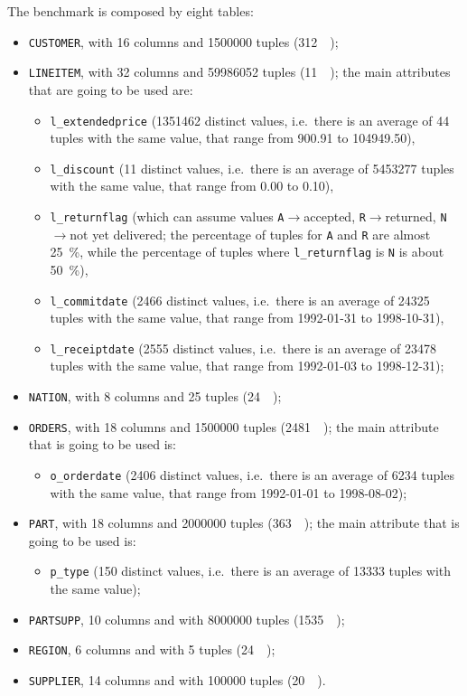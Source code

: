 The benchmark is composed by eight tables:
\begin{itemize}
	\item \texttt{CUSTOMER}, with \num{16} columns and \num{1500000} tuples (\SI{312}{\mega\byte});
	\item \texttt{LINEITEM}, with \num{32} columns and \num{59986052} tuples (\SI{11}{\giga\byte}); the main attributes that are going to be used are:
		\begin{itemize}
			\item \texttt{l\_extendedprice} (\num{1351462} distinct values, i.e.\ there is an average of \num{44} tuples with the same value, that range from \num{900.91} to \num{104949.50}),
			\item \texttt{l\_discount} (\num{11} distinct values, i.e.\ there is an average of \num{5453277} tuples with the same value, that range from \num{0.00} to \num{0.10}),
			\item \texttt{l\_returnflag} (which can assume values \texttt{A}$\rightarrow$accepted, \texttt{R}$\rightarrow$returned, \texttt{N}$\rightarrow$not yet delivered; the percentage of tuples for \texttt{A} and \texttt{R} are almost \SI{25}{\percent}, while the percentage of tuples where \texttt{l\_returnflag} is \texttt{N} is about \SI{50}{\percent}),
			\item \texttt{l\_commitdate} (\num{2466} distinct values, i.e.\ there is an average of \num{24325} tuples with the same value, that range from {1992-01-31} to {1998-10-31}),
			\item \texttt{l\_receiptdate} (\num{2555} distinct values, i.e.\ there is an average of \num{23478} tuples with the same value, that range from {1992-01-03} to {1998-12-31});
		\end{itemize}
	\item \texttt{NATION}, with \num{8} columns and \num{25} tuples (\SI{24}{\kilo\byte});
	\item \texttt{ORDERS}, with \num{18} columns and \num{1500000} tuples (\SI{2481}{\kilo\byte}); the main attribute that is going to be used is:
		\begin{itemize}
			\item \texttt{o\_orderdate} (\num{2406} distinct values, i.e.\ there is an average of \num{6234} tuples with the same value, that range from {1992-01-01} to {1998-08-02});
		\end{itemize}
	\item \texttt{PART}, with \num{18} columns and \num{2000000} tuples (\SI{363}{\mega\byte}); the main attribute that is going to be used is:
		\begin{itemize}
			\item \texttt{p\_type} (\num{150} distinct values, i.e.\ there is an average of \num{13333} tuples with the same value);
		\end{itemize}
	\item \texttt{PARTSUPP}, \num{10} columns and with \num{8000000} tuples (\SI{1535}{\mega\byte});
	\item \texttt{REGION}, \num{6} columns and with \num{5} tuples (\SI{24}{\kilo\byte});
	\item \texttt{SUPPLIER}, \num{14} columns and with \num{100000} tuples (\SI{20}{\mega\byte}).
\end{itemize}

